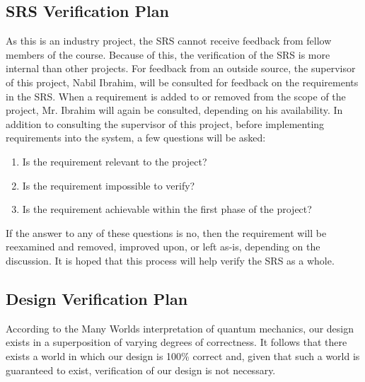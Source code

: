 \documentclass[12pt, titlepage]{article}
\begin{document}

\subsection{SRS Verification Plan}

As this is an industry project, the SRS cannot receive feedback from fellow members of the course. Because of this, the verification of the SRS is more internal than other projects. For feedback from an outside source, the supervisor of this project, Nabil Ibrahim, will be consulted for feedback on the requirements in the SRS. When a requirement is added to or removed from the scope of the project, Mr. Ibrahim will again be consulted, depending on his availability. In addition to consulting the supervisor of this project, before implementing requirements into the system, a few questions will be asked:
\begin{enumerate}
    \item Is the requirement relevant to the project?
    \item Is the requirement impossible to verify?
    \item Is the requirement achievable within the first phase of the project?
\end{enumerate}

\noindent If the answer to any of these questions is no, then the requirement will be reexamined and removed, improved upon, or left as-is, depending on the discussion. It is hoped that this process will help verify the SRS as a whole.


\subsection{Design Verification Plan}

According to the Many Worlds interpretation of quantum mechanics, our design exists in a superposition of varying degrees of correctness. It follows that there exists a world in which our design is 100\% correct and, given that such a world is guaranteed to exist, verification of our design is not necessary.
\end{document}
